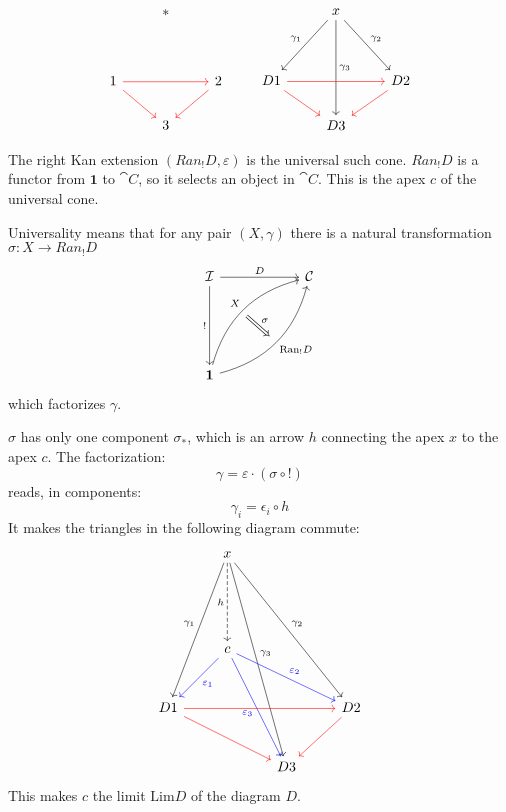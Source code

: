 \documentclass[DaoFP]{subfiles}
\begin{document}
\[
 \begin{tikzcd}
  & *
 \\
\\
1 
\arrow[rr, red]
\arrow[rd, red]
&& 2
\arrow[dl, red]
\\
& 3
 \end{tikzcd}
 \qquad
 \begin{tikzcd}
  & x
\arrow[ddr, "\gamma_2"]
 \arrow[ddl, "\gamma_1"']
 \arrow[ddd, "\gamma_3"]
 \\
\\
D 1 
\arrow[rr, red]
\arrow[rd, red]
&& D 2
\arrow[dl, red]
\\
& D 3
 \end{tikzcd}
 \]



The right Kan extension $(Ran_! D, \varepsilon)$ is the universal such cone. $Ran_! D$ is a functor from $\mathbf 1$ to $\cat C$, so it selects an object in $\cat C$. This is the apex $c$ of the universal cone. 

Universality means that for any pair $(X, \gamma)$ there is a natural transformation $\sigma \colon X \to Ran_! D$ 
\[
\begin{tikzcd}[row sep=2cm, column sep=2cm]
\cat I  \ar[d, "!"', "" {name=P}]
            \ar[r, "D", ""  {name=F, below, near start, bend right}]
&
\cat C
\\
\mathbf 1
    \ar[ur, bend left, "X", "" {name=G, below}]
    \ar[ur, bend right, "\text{Ran}_! D"', "" {name=Ran}]
\arrow[Rightarrow, "\sigma", from=G, to=Ran]
\end{tikzcd}
\]
which factorizes $\gamma$. 

$\sigma$ has only one component $\sigma_*$, which is an arrow $h$ connecting the apex $x$ to the apex $c$. The factorization:
 \[ \gamma = \varepsilon \cdot (\sigma \circ !) \]
reads, in components:
\[ \gamma_i = \epsilon_i \circ h \]
It makes the triangles in the following diagram commute:
\[
 \begin{tikzcd}[row sep=1cm]
  & x
\arrow[dddl, "\gamma_1"']
\arrow[ddddr, "\gamma_3"]
\arrow[dddrr, "\gamma_2"]
\arrow[dd, dashed, "h"']
 \\
 \\
 & c
\arrow[dl, blue, "\varepsilon_1"]
\arrow[ddr, blue, "\varepsilon_3"']
\arrow[drr, blue, "\varepsilon_2"]
\\
D 1 
\arrow[rrr, red]
\arrow[rrd, red]
&&& D 2
\arrow[dl, red]
\\
&& D 3
 \end{tikzcd}
 \]
This makes $c$ the limit $\text{Lim} D$ of the diagram $D$.
 
\end{document}
